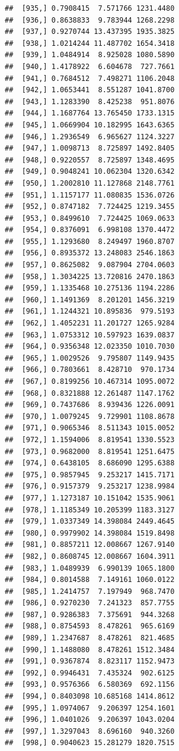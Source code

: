 \documentclass[article]{jss}\usepackage[]{graphicx}\usepackage[]{xcolor}
\makeatletter
\newenvironment{kframe}{%
 \def\at@end@of@kframe{}%
 \ifinner\ifhmode%
  \def\at@end@of@kframe{\end{minipage}}%
  \begin{minipage}{\columnwidth}%
 \fi\fi%
 \def\FrameCommand##1{\hskip\@totalleftmargin \hskip-\fboxsep
 \colorbox{shadecolor}{##1}\hskip-\fboxsep
     \hskip-\linewidth \hskip-\@totalleftmargin \hskip\columnwidth}%
 \MakeFramed {\advance\hsize-\width
   \@totalleftmargin\z@ \linewidth\hsize
   \@setminipage}}%
 {\par\unskip\endMakeFramed%
 \at@end@of@kframe}
\newenvironment{knitrout}{}{} %
\makeatother
\begin{document}
\begin{knitrout}
\begin{kframe}
\begin{verbatim}
##  [935,] 0.7908415  7.571766 1231.4480
##  [936,] 0.8638833  9.783944 1268.2298
##  [937,] 0.9270744 13.437395 1935.3825
##  [938,] 1.0214244 11.487702 1654.3418
##  [939,] 1.0484914  8.925028 1080.5890
##  [940,] 1.4178922  6.604678  727.7661
##  [941,] 0.7684512  7.498271 1106.2048
##  [942,] 1.0653441  8.551287 1041.8700
##  [943,] 1.1283390  8.425238  951.8076
##  [944,] 1.1687764 13.765450 1733.1315
##  [945,] 1.0669904 10.182995 1643.6365
##  [946,] 1.2936549  6.965627 1124.3227
##  [947,] 1.0098713  8.725897 1492.8405
##  [948,] 0.9220557  8.725897 1348.4695
##  [949,] 0.9048241 10.062304 1320.6342
##  [950,] 1.2002810 11.127868 2148.7761
##  [951,] 1.1157177 11.080835 1536.0726
##  [952,] 0.8747182  7.724425 1219.3455
##  [953,] 0.8499610  7.724425 1069.0633
##  [954,] 0.8376091  6.998108 1370.4472
##  [955,] 1.1293680  8.249497 1960.8707
##  [956,] 0.8935372 13.248083 2546.1863
##  [957,] 0.8625082  9.087904 2704.0603
##  [958,] 1.3034225 13.720816 2470.1863
##  [959,] 1.1335468 10.275136 1194.2286
##  [960,] 1.1491369  8.201201 1456.3219
##  [961,] 1.1244321 10.895836  979.5193
##  [962,] 1.4052231 11.201727 1265.9284
##  [963,] 1.0753312 10.597923 1639.0837
##  [964,] 0.9356348 12.023350 1010.7030
##  [965,] 1.0029526  9.795807 1149.9435
##  [966,] 0.7803661  8.428710  970.1734
##  [967,] 0.8199256 10.467314 1095.0072
##  [968,] 0.8321888 12.261487 1147.1762
##  [969,] 0.7437686  8.939436 1226.0091
##  [970,] 1.0079245  9.729901 1108.8678
##  [971,] 0.9065346  8.511343 1015.0052
##  [972,] 1.1594006  8.819541 1330.5523
##  [973,] 0.9682000  8.819541 1251.6475
##  [974,] 0.6438105  8.686090 1295.6388
##  [975,] 0.9857945  9.253217 1415.7171
##  [976,] 0.9157379  9.253217 1238.9984
##  [977,] 1.1273187 10.151042 1535.9061
##  [978,] 1.1185349 10.205399 1183.3127
##  [979,] 1.0337349 14.398084 2449.4645
##  [980,] 0.9979902 14.398084 1519.8498
##  [981,] 0.8857211 12.008667 1267.9140
##  [982,] 0.8608745 12.008667 1604.3911
##  [983,] 1.0489939  6.990139 1065.1800
##  [984,] 0.8014588  7.149161 1060.0122
##  [985,] 1.2414757  7.197949  968.7470
##  [986,] 0.9270230  7.241323  857.7755
##  [987,] 0.9286383  7.375691  944.3268
##  [988,] 0.8754593  8.478261  965.6169
##  [989,] 1.2347687  8.478261  821.4685
##  [990,] 1.1488080  8.478261 1512.3484
##  [991,] 0.9367874  8.823117 1152.9473
##  [992,] 0.9946431  7.435324  902.6125
##  [993,] 0.9576366  6.580369  692.1156
##  [994,] 0.8403098 10.685168 1414.8612
##  [995,] 1.0974067  9.206397 1254.1601
##  [996,] 1.0401026  9.206397 1043.0204
##  [997,] 1.3297043  8.696160  940.3260
##  [998,] 0.9040623 15.281279 1820.7515

\end{verbatim}
\end{kframe}
\end{knitrout}
\end{document}
